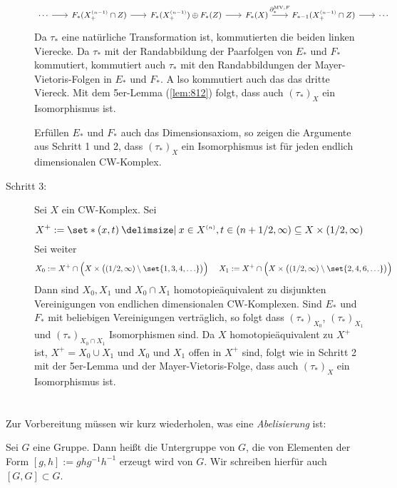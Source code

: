 \begin{beweis}
\begin{description}
\[\begin{tikzcd}[column sep=1.8em, row sep=2.5em,font=\small]
				\cdots \rar & F_* \enbrace{X_+^\ssbrace{n-1} \cap Z} \rar & F_*\enbrace{X_+^\ssbrace{n-1}} \oplus F_*(Z) \rar 
				& F_*(X) \rar["\partial_*^{\mathrm{MV},F}"] & F_{*-1} \enbrace{X_+^\ssbrace{n-1} \cap Z} \rar & \cdots
			\end{tikzcd}
		\]
		Da $\tau_*$ eine natürliche Transformation ist, kommutierten die beiden linken Vierecke. 
		Da $\tau_*$ mit der Randabbildung der Paarfolgen von $E_*$ und $F_*$ kommutiert, kommutiert auch $\tau_*$ mit den Randabbildungen der Mayer-Vietoris-Folgen in $E_*$ und $F_*$. A
		lso kommutiert auch das das dritte Viereck. 
		Mit dem 5er-Lemma (\ref{lem:812}) folgt, dass auch $(\tau_*)_X$ ein Isomorphismus ist.
	
		Erfüllen $E_*$ und $F_*$ auch das Dimensionsaxiom, so zeigen die Argumente aus Schritt 1 und 2, dass $(\tau_*)_X$ ein Isomorphismus ist für jeden endlich dimensionalen CW-Komplex.
		\item[Schritt 3:] Sei $X$ ein CW-Komplex. Sei
		\[
			X^+ := \set*{(x,t) \given x \in X^\ssbrace{n}, t \in \enbrace*{n+ 1/2,\infty}\rule{0cm}{1em}} \subseteq X \times \enbrace*{1/2 ,\infty}
		\]
		Sei weiter
		\[
			X_0 := X^+ \cap \enbrace[\Big]{X \times \enbrace[\big]{(1/2,\infty) \setminus \set{1,3,4,\ldots } } } \quad \,\,
			X_1 := X^+ \cap \enbrace[\Big]{X \times \enbrace[\big]{(1/2,\infty) \setminus \set{2,4,6,\ldots } } } 
		\]
		Dann sind $X_0,X_1$ und $X_0 \cap X_1$ homotopieäquivalent zu disjunkten Vereinigungen von endlichen dimensionalen CW-Komplexen. 
		Sind $E_*$ und $F_*$ mit beliebigen Vereinigungen verträglich, so folgt dass $(\tau_*)_{X_0}$, $(\tau_*)_{X_1}$ und $(\tau_*)_{X_0\cap X_1}$ Isomorphismen sind. 
		Da $X$ homotopieäquivalent zu $X^+$ ist, $X^+ =X_0 \cup X_1$ und $X_0$ und $X_1$ offen in $X^+$ sind, folgt wie in Schritt 2 mit der 5er-Lemma und der Mayer-Vietoris-Folge, dass auch $(\tau_*)_X$ ein Isomorphismus ist. \qedhere
	\end{description}
\end{beweis}

\newpage
\section{} %
\label{sec:15}

Zur Vorbereitung müssen wir kurz wiederholen, was eine \emph{Abelisierung} ist:

\begin{definition}[{name=[Kommutatorgruppe]}]
	Sei $G$ eine Gruppe. Dann heißt die Untergruppe von $G$, die von Elementen der Form $[g,h]:= g h g^{-1} h ^{-1}$ erzeugt wird  von $G$. 
	Wir schreiben hierfür auch $[G,G] \subset G$.
\end{definition}

